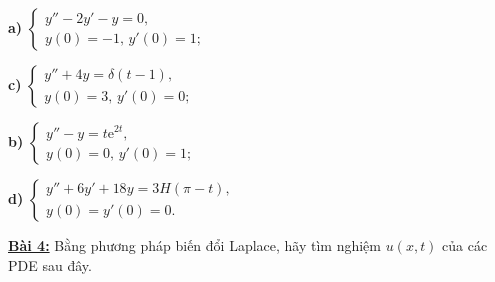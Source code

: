 \documentclass[10pt, a4paper]{article}
\begin{document}
	\begin{multicols}{2}
		\begin{flushleft}
			\textbf{a) }$\begin{cases}
				y''-2y'-y=0,\\
				y(0)=-1,\,y'(0)=1;
			\end{cases}$
		\end{flushleft}
		\begin{flushleft}
			\textbf{c) }$\begin{cases}
				y''+4y=\delta(t-1),\\
				y(0)=3,\,y'(0)=0;
			\end{cases}$
		\end{flushleft}
		\columnbreak
		\begin{flushleft}
			\textbf{b) }$\begin{cases}
				y''-y=t\mathrm e^{2t},\\
				y(0)=0,\,y'(0)=1;
			\end{cases}$
		\end{flushleft}
		\begin{flushleft}
		\textbf{d) }$\begin{cases}
			y''+6y'+18y=3H(\pi-t),\\
			y(0)=y'(0)=0.
		\end{cases}$
		\end{flushleft}
	\end{multicols}
	\color{red}\textbf{\underline{Bài 4:}} \color{black}Bằng phương pháp biến đổi Laplace, hãy tìm nghiệm $u(x,t)$ của các PDE sau đây.
\end{document}
